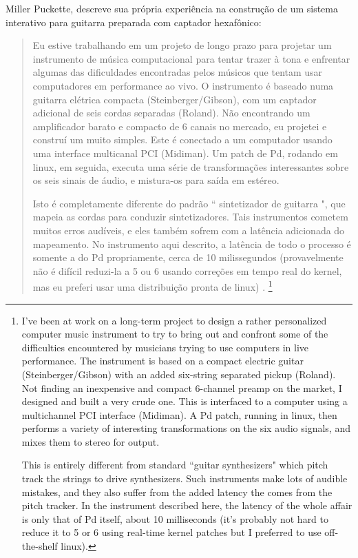 \documentclass{ppgmus}
\begin{document}
 
Miller Puckette, descreve sua própria experiência na construção de um sistema interativo
para guitarra preparada com captador hexafônico:

\begin{quote}
Eu estive trabalhando em um projeto de longo prazo para projetar um
instrumento de música computacional para tentar trazer à tona e enfrentar algumas das dificuldades encontradas pelos
músicos que tentam usar computadores em performance ao vivo. O instrumento é baseado numa guitarra elétrica compacta
(Steinberger/Gibson), com um captador adicional de seis cordas separadas (Roland). Não encontrando um
amplificador barato e compacto de 6 canais no mercado, eu projetei e construí um muito simples.
Este é conectado a um computador usando uma interface multicanal PCI (Midiman). Um patch de Pd, rodando em
linux, em seguida, executa uma série de transformações interessantes sobre os seis sinais de áudio, e mistura-os
para saída em estéreo.

Isto é completamente diferente do padrão `` sintetizador de guitarra ", que mapeia as cordas para conduzir
sintetizadores. Tais instrumentos cometem muitos erros audíveis, e eles também sofrem com a latência adicionada do mapeamento. 
No instrumento aqui descrito, a latência de todo o processo é
somente a do Pd propriamente, cerca de 10 milissegundos (provavelmente não é difícil reduzi-la a 5 ou 6 usando
correções em tempo real do kernel, mas eu preferi usar uma distribuição pronta de linux) \cite{Puckette_patchfor}.
\footnote{I've been at work on a long-term project to design a rather personalized 
computer music instrument to try to bring out and confront some of the difficulties encountered by 
musicians trying to use computers in live performance. The instrument is based on a compact electric 
guitar (Steinberger/Gibson) with an added six-string separated pickup (Roland). Not finding an 
inexpensive and compact 6-channel preamp on the market, I designed and built a very crude one. 
This is interfaced to a computer using a multichannel PCI interface (Midiman). A Pd patch, running in 
linux, then performs a variety of interesting transformations on the six audio signals, and mixes them 
to stereo for output.

This is entirely different from standard ``guitar synthesizers" which pitch track the strings to drive 
synthesizers. Such instruments make lots of audible mistakes, and they also suffer from the added latency 
the comes from the pitch tracker. In the instrument described here, the latency of the whole affair is 
only that of Pd itself, about 10 milliseconds (it's probably not hard to reduce it to 5 or 6 using 
real-time kernel patches but I preferred to use off-the-shelf linux).}
\end{quote}
\end{document}
